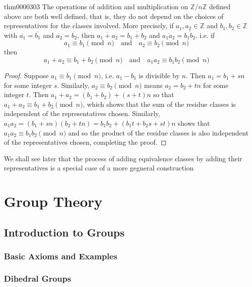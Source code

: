 \documentclass[cn,11pt,chinese]{elegantbook}
\numberwithin{equation}{section}
\begin{document}
\begin{theorem}{}{thm0000303}
The operations of addition and multiplication on $\mathbb{Z}/n\mathbb{Z}$ defined above are both well defined, that is, they do not depend on the choices of representatives for the classes involved. More precisely, if $a_1, a_2 \in \mathbb{Z}$ and $b_1, b_2 \in \mathbb{Z}$ with $\overline{a_1} = \overline{b_1}$ and $\overline{a_2} = \overline{b_2}$, then $\overline{a_1 + a_2} = \overline{b_1+b_2}$ and $\overline{a_1a_2} = \overline{b_1b_2}$. i.e. if
\[
a_1 \equiv b_1 \pmod{n} \quad \text{and}\quad a_2 \equiv b_2 \pmod{n}
\]
then
\[
a_1 + a_2 \equiv b_1 + b_2 \pmod{n} \quad \text{and}\quad a_1a_2 \equiv b_1b_2 \pmod{n}
\]
\end{theorem}

\begin{proof}
Suppose $a_1 \equiv b_1\pmod{n}$, i.e. $a_1-b_1$ is divisible by $n$. Then $a_1 = b_1 + sn$ for some integer $s$. Similarly, $a_2\equiv b_2\pmod{n}$ means $a_2 = b_2 + tn$ for some integer $t$. Then $a_1+a_2 = (b_1+b_2) + (s+t)n$ so that $a_1+a_2 \equiv b_1+b_2 \pmod{n}$, which shows that the sum of the residue classes is independent of the representatives chosen. Similarly, $a_1a_2 = (b_1+sn)(b_2+tn) = b_1b_2 + (b_1t + b_2s + st)n$ shows that $a_1a_2 \equiv b_1b_2 \pmod{n}$ and so the product of the residue classes is also independent of the representatives chosen, completing the proof.
\end{proof}

We shall see later that the process of adding equivalence classes by adding their representatives is a special case of a more gegneral construction


\part{Group Theory}
\chapter{Introduction to Groups}\label{chapter001}
\section{Basic Axioms and Examples}\label{section00101}


\section{Dihedral Groups}\label{section00102}
\end{document}
